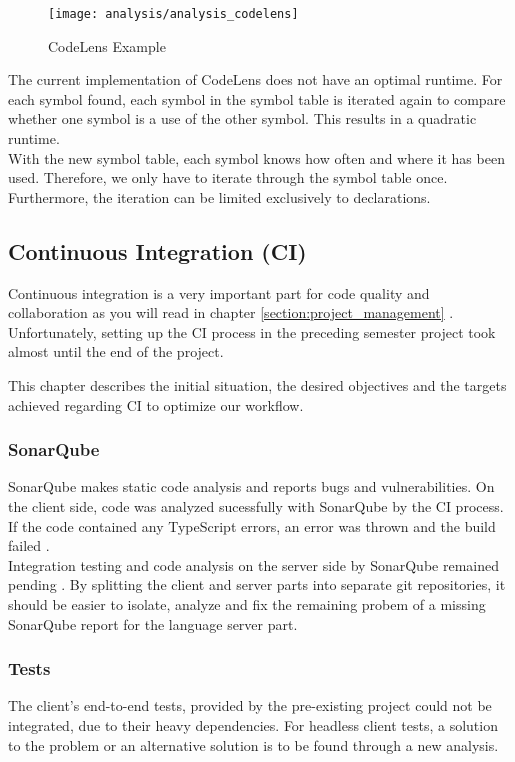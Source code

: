 \begin{figure}[H]
    \centering
    \texttt{[image: analysis/analysis\_codelens]}
    \caption{CodeLens Example}
    \label{fig:analysis_codelens}
\end{figure}

The current implementation of CodeLens does not have an optimal runtime. For each symbol found, each symbol in the symbol table is iterated again to compare whether one symbol is a use of the other symbol. This results in a quadratic runtime. \\

With the new symbol table, each symbol knows how often and where it has been used.
Therefore, we only have to iterate through the symbol table once.
Furthermore, the iteration can be limited exclusively to  declarations.

\subsection{Continuous Integration (CI)}
\label{section:analysis:CI}

Continuous integration is a very important part for code quality and collaboration
as you will read in chapter \ref{section:project_management} .
Unfortunately, setting up the CI process in the preceding semester project\cite{sa} took almost until the end of the project.

This chapter describes the initial situation, the desired objectives and the targets achieved regarding CI to optimize our workflow.

\subsubsection{SonarQube}
SonarQube makes static code analysis and reports bugs and vulnerabilities.
On the client side, code was analyzed sucessfully with SonarQube by the CI process.
If the code contained any TypeScript errors, an error was thrown and the build failed \cite{sa}.\\

Integration testing and code analysis on the server side by SonarQube remained pending \cite{sa}.
By splitting the client and server parts into separate git repositories,
it should be easier to isolate, analyze and fix the remaining probem of a missing SonarQube report for the language server part.

\subsubsection{Tests}
The client's end-to-end tests, provided by the pre-existing project could not be integrated, due to their heavy dependencies.
For headless client tests, a solution to the problem or an alternative solution is to be found through a new analysis. \\

